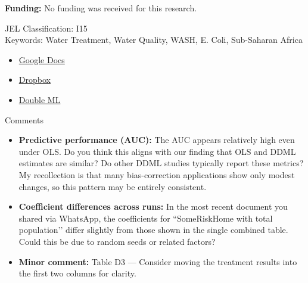 \documentclass [11pt]{article}
\theoremstyle{plain}
\theoremstyle{definition}
\theoremstyle{remark}
\newcommand{\1}{\bm{1}}
\begin{document}
\doublespacing 

\noindent
\textbf{Funding:}
No funding was received for this research.

\noindent 
JEL Classification: I15 \\
\noindent 
Keywords: Water Treatment, Water Quality, WASH, E. Coli, Sub-Saharan Africa

\begin{itemize}
\item \href{https://docs.google.com/document/d/1VpyidSOLfcp7vShdWENKIl0B17a6ory5JjOUVZ8X8vY/edit?tab=t.0}{Google Docs}
\item \href{https://www.dropbox.com/scl/fo/vn55vxpshgnggq5omz1fe/AFpfqHtUH1Q1MqyJ8SoMAQ8?rlkey=h3qh2m9d6pxrxe7q7e071ljeo&dl=0}{Dropbox}
\item \href{https://docs.doubleml.org/stable/guide/guide.html}{Double ML}
\end{itemize}

\clearpage
Comments

\begin{itemize}
\item \textbf{Predictive performance (AUC):} The AUC appears relatively high even under OLS. Do you think this aligns with our finding that OLS and DDML estimates are similar? Do other DDML studies typically report these metrics? My recollection is that many bias-correction applications show only modest changes, so this pattern may be entirely consistent.

\item \textbf{Coefficient differences across runs:} In the most recent document you shared via WhatsApp, the coefficients for ``SomeRiskHome with total population’’ differ slightly from those shown in the single combined table. Could this be due to random seeds or related factors?

\item \textbf{Minor comment:} Table D3 — Consider moving the treatment results into the first two columns for clarity.
\end{itemize}

\clearpage
\end{document}
